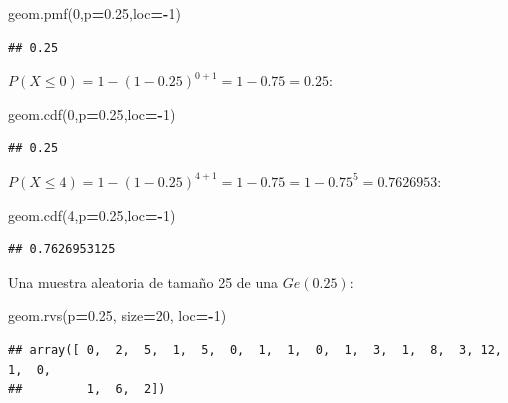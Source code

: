\documentclass[]{book}
\newenvironment{Shaded}{\begin{snugshade}}{\end{snugshade}}
\newcommand{\DecValTok}[1]{\textcolor[rgb]{0.00,0.00,0.81}{#1}}
\newcommand{\FloatTok}[1]{\textcolor[rgb]{0.00,0.00,0.81}{#1}}
\newcommand{\NormalTok}[1]{#1}
\newcommand{\OperatorTok}[1]{\textcolor[rgb]{0.81,0.36,0.00}{\textbf{#1}}}
\begin{document}
\begin{Shaded}
\begin{Highlighting}[]
\NormalTok{geom.pmf(}\DecValTok{0}\NormalTok{,p}\OperatorTok{=}\FloatTok{0.25}\NormalTok{,loc}\OperatorTok{=-}\DecValTok{1}\NormalTok{)}
\end{Highlighting}
\end{Shaded}

\begin{verbatim}
## 0.25
\end{verbatim}

\(P(X\leq 0)=1- (1-0.25)^{0+1}=1-0.75=0.25\):

\begin{Shaded}
\begin{Highlighting}[]
\NormalTok{geom.cdf(}\DecValTok{0}\NormalTok{,p}\OperatorTok{=}\FloatTok{0.25}\NormalTok{,loc}\OperatorTok{=-}\DecValTok{1}\NormalTok{)}
\end{Highlighting}
\end{Shaded}

\begin{verbatim}
## 0.25
\end{verbatim}

\(P(X\leq 4)=1-(1-0.25)^{4+1}=1-0.75=1-0.75^5=0.7626953\):

\begin{Shaded}
\begin{Highlighting}[]
\NormalTok{geom.cdf(}\DecValTok{4}\NormalTok{,p}\OperatorTok{=}\FloatTok{0.25}\NormalTok{,loc}\OperatorTok{=-}\DecValTok{1}\NormalTok{)}
\end{Highlighting}
\end{Shaded}

\begin{verbatim}
## 0.7626953125
\end{verbatim}

Una muestra aleatoria de tamaño 25 de una \(Ge(0.25)\):

\begin{Shaded}
\begin{Highlighting}[]
\NormalTok{geom.rvs(p}\OperatorTok{=}\FloatTok{0.25}\NormalTok{, size}\OperatorTok{=}\DecValTok{20}\NormalTok{, loc}\OperatorTok{=-}\DecValTok{1}\NormalTok{)}
\end{Highlighting}
\end{Shaded}

\begin{verbatim}
## array([ 0,  2,  5,  1,  5,  0,  1,  1,  0,  1,  3,  1,  8,  3, 12,  1,  0,
##         1,  6,  2])
\end{verbatim}
\end{document}

